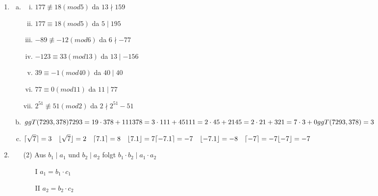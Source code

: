 \documentclass[a4paper]{scrartcl}
\title{\titleinfo}
\author{Elena Noll, Sven-Hendrik Haase, Arne Feil}
\date{\today}
\begin{document}
\maketitle
\begin{enumerate}[1.]
\item
\begin{enumerate}[a)]
\item
\begin{enumerate}[(i)]
\item $177 \not\equiv 18 (mod 5)$ da $13 \nmid 159$
\item $177 \equiv 18 (mod 5)$ da $5 \mid 195$
\item $-89\not\equiv -12 (mod 6)$ da $6 \nmid -77$
\item $-123 \equiv 33 (mod 13)$ da $13 \mid -156$
\item $39 \equiv -1 (mod 40)$ da $40 \mid 40$
\item $77 \equiv 0 (mod 11)$ da $11 \mid 77$
\item $2^{51} \not\equiv 51 (mod 2)$ da $2 \nmid 2^{51}-51$\\
\end{enumerate}
\item
$ggT(7293,378) \\
7293 = 19 \cdot 378 + 111 \\
378 = 3 \cdot 111 + 45 \\
111 = 2 \cdot 45 + 21 \\
45 = 2 \cdot 21 + 3 \\
21 = 7 \cdot 3 + 0 \\ \\
ggT(7293,378)=3$\\
\item
$\lceil\sqrt{7}\rceil = 3 \quad \lfloor\sqrt{7}\rfloor = 2 \quad \lceil7.1\rceil = 8 \quad \lfloor7.1\rfloor = 7 \\
\lceil-7.1\rceil = -7 \quad \lfloor-7.1\rfloor = -8 \quad \lceil-7\rceil = -7 \lfloor-7\rfloor = -7$\\
\end{enumerate}
\item
\begin{enumerate}
\item[(2)]
Aus $b_1 \mid a_1$ und $b_2 \mid a_2$ folgt $b_1 \cdot b_2 \mid a_1 \cdot a_2$ \\
\begin{enumerate}
\item[I] $a_1 = b_1 \cdot c_1$
\item[II] $a_2 = b_2 \cdot c_2$\\

\end{enumerate}
\end{enumerate}
\end{enumerate}
\end{document}
